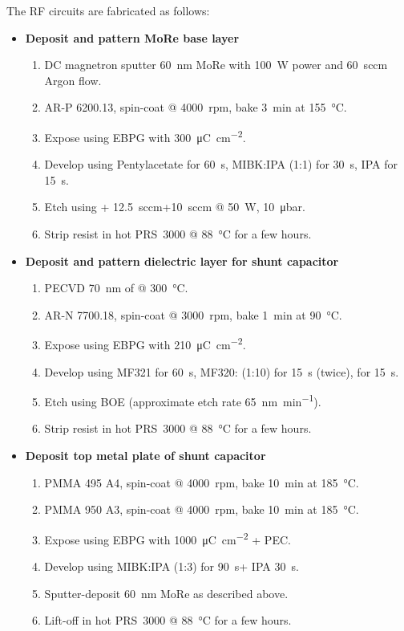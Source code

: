 The RF circuits are fabricated as follows:
\begin{itemize}
	\item \textbf{Deposit and pattern MoRe base layer}
	\begin{enumerate}
		\item DC magnetron sputter \SI{60}{\nano\meter} MoRe with \SI{100}{\watt} power and \SI{60}{sccm} Argon flow.
		\item AR-P 6200.13, spin-coat @ \SI{4000}{rpm}, bake \SI{3}{\minute} at \SI{155}{\celsius}.
		\item Expose using EBPG with \SI{300}{\micro\coulomb\per\centi\meter\squared}.
		\item Develop using Pentylacetate for \SI{60}{\second}, MIBK:IPA (1:1) for \SI{30}{\second}, IPA for \SI{15}{\second}.
		\item Etch using + \SI{12.5}{sccm}+\SI{10}{sccm} @ \SI{50}{\watt}, \SI{10}{\micro\bar}.
		\item Strip resist in hot PRS~3000 @ \SI{88}{\celsius} for a few hours.
	\end{enumerate}
	\item \textbf{Deposit and pattern dielectric layer for shunt capacitor}
	\begin{enumerate}
		\item PECVD \SI{70}{\nano\meter} of  @ \SI{300}{\celsius}.
		\item AR-N 7700.18, spin-coat @ \SI{3000}{rpm}, bake \SI{1}{\minute} at \SI{90}{\celsius}.
		\item Expose using EBPG with \SI{210}{\micro\coulomb\per\centi\meter\squared}.
		\item Develop using MF321 for \SI{60}{\second}, MF320: (1:10) for \SI{15}{\second} (twice),  for \SI{15}{\second}.
		\item Etch using BOE (approximate etch rate \SI{65}{\nano\meter\per\minute}).
		\item Strip resist in hot PRS~3000 @ \SI{88}{\celsius} for a few hours.
	\end{enumerate}
	\item \textbf{Deposit top metal plate of shunt capacitor}
	\begin{enumerate}
		\item PMMA 495 A4, spin-coat @ \SI{4000}{rpm}, bake \SI{10}{\minute} at \SI{185}{\celsius}.
		\item PMMA 950 A3, spin-coat @ \SI{4000}{rpm}, bake \SI{10}{\minute} at \SI{185}{\celsius}.
		\item Expose using EBPG with \SI{1000}{\micro\coulomb\per\centi\meter\squared} + PEC.
		\item Develop using MIBK:IPA (1:3) for \SI{90}{\second}+ IPA \SI{30}{\second}.
		\item Sputter-deposit \SI{60}{\nano\meter} MoRe as described above.
		\item Lift-off in hot PRS~3000 @ \SI{88}{\celsius} for a few hours.
	\end{enumerate}
\end{itemize}

